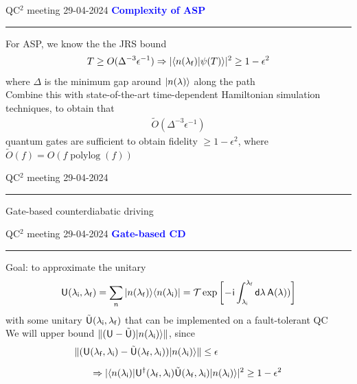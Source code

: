 \documentclass{beamer}
\def\lbt{\small QC$^2$ meeting 29-04-2024} %
\DeclareMathOperator{\polylog}{polylog}
\def\mt#1{\kern0.025em\mathsf{#1}\kern0.025em}
\def\d{\mathsf d}
\def\i{\mathsf i}
\def\lambdai{{\lambda_{\sf i}}}
\def\lambdaf{{\lambda_{\sf f}}}
\newenvironment{dia}[2]
{
	\begin{frame}
	\vspace{1mm}
	{\small #1}
	\hfill
    {\small\bf\textcolor{blue}{#2}}
	\vspace{3mm}
	\hrule
	\bigskip
}
{
	\vfill
	\end{frame}
}
\begin{document}
\begin{dia}{\lbt}{Complexity of ASP}
For ASP, we know the the JRS bound
\begin{align*}
    T \geq O(\Delta^{-3} \epsilon^{-1} 
    ) \Rightarrow |\braket{n(\lambdaf)}{\psi(T)}|^2 \geq 1 - \epsilon^2
\end{align*}
where $\Delta$ is the minimum gap around ${|n(\lambda)\rangle}$ along the path \\[4mm] \pause
Combine this with state-of-the-art time-dependent Hamiltonian simulation techniques, to obtain that
\begin{align*}
    \tilde O(\Delta^{-3} \epsilon^{-1}
    )
\end{align*}
quantum gates are sufficient to obtain fidelity $\geq 1 - \epsilon^2$, where $\tilde O(f) = O(f \polylog(f))$
\vspace{-1cm}
\end{dia}

\begin{dia}{\lbt}{}
\vspace{2.5cm}
\begin{center}
\begin{LARGE}
\textcolor{mygreen}{Gate-based counterdiabatic driving}
\end{LARGE}
\end{center}
\vspace*{1.5cm}
\end{dia}

\begin{dia}{\lbt}{Gate-based CD}
Goal: to approximate the unitary
\begin{align*}
    \mt U(\lambdai, \lambdaf) = \sum_n \ket{n(\lambdaf)}\bra{n(\lambdai)} = \mathcal T \exp \bigg[ \! -\!\i \int_\lambdai^\lambdaf \d\lambda \, \mt A(\lambda)) \bigg]
\end{align*}
with some unitary $\tilde{\mt U}(\lambdai, \lambdaf)$ that can be implemented on a fault-tolerant QC \\[4mm] \pause
We will upper bound $\|(\mt U - \tilde{\mt U})\ket{n(\lambdai)}\|$, since
\begin{align*}
    \|(\mt U&(\lambdaf, \lambdai) - \tilde{\mt U}(\lambdaf, \lambdai))\ket{n(\lambdai)}\| \leq \epsilon \nonumber \\[2mm]
    &\Rightarrow |\bra{n(\lambdai)} \mt U\t(\lambdaf, \lambdai) \tilde{\mt U}(\lambdaf, \lambdai) \ket{n(\lambdai)}|^2 \geq 1 - \epsilon^2
\end{align*}
\vspace*{-1.4cm}
\end{dia}
\end{document}
